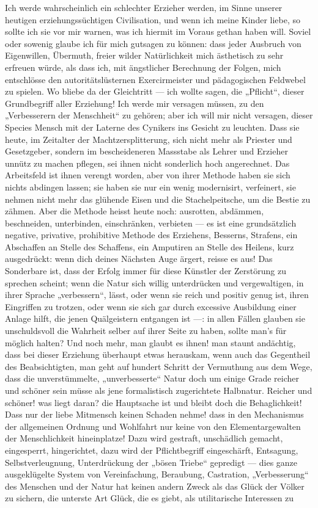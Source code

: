 Ich werde wahrscheinlich ein schlechter Erzieher werden, im Sinne unserer heutigen erziehungssüchtigen Civilisation, und wenn ich meine Kinder liebe, so sollte ich sie vor mir warnen, was ich hiermit im Voraus gethan haben will. Soviel oder sowenig glaube ich für mich gutsagen zu können: dass jeder Ausbruch von Eigenwillen, Übermuth, freier wilder Natürlichkeit mich ästhetisch zu sehr erfreuen würde, als dass ich, mit ängstlicher Berechnung der Folgen, mich entschlösse den autoritätslüsternen Exercirmeister und pädagogischen Feldwebel zu spielen. Wo bliebe da der Gleichtritt — ich wollte sagen, die „Pflicht“, dieser Grundbegriff aller Erziehung! Ich werde mir versagen müssen, zu den „Verbesserern der Menschheit“ zu gehören; aber ich will mir nicht versagen, dieser Species Mensch mit der Laterne des Cynikers ins Gesicht zu leuchten. Dass sie heute, im Zeitalter der Machtzersplitterung, sich nicht mehr als Priester und Gesetzgeber, sondern im bescheideneren Massstabe als Lehrer und Erzieher unnütz zu machen pflegen, sei ihnen nicht sonderlich hoch angerechnet. Das Arbeitsfeld ist ihnen verengt worden, aber von ihrer Methode haben sie sich nichts abdingen lassen; sie haben sie nur ein wenig modernisirt, verfeinert, sie nehmen nicht mehr das glühende Eisen und die Stachelpeitsche, um die Bestie zu zähmen. Aber die Methode heisst heute noch: ausrotten, abdämmen, beschneiden, unterbinden, einschränken, verbieten — es ist eine grundsätzlich negative, privative, prohibitive Methode des Erziehens, Besserns, Strafens, ein Abschaffen an Stelle des Schaffens, ein Amputiren an Stelle des Heilens, kurz ausgedrückt: wenn dich deines Nächsten Auge ärgert, reisse es aus! Das Sonderbare ist, dass der Erfolg immer für diese Künstler der Zerstörung zu sprechen scheint; wenn die Natur sich willig unterdrücken und vergewaltigen, in ihrer Sprache „verbessern“, lässt, oder wenn sie reich und positiv genug ist, ihren Eingriffen zu trotzen, oder wenn sie sich gar durch excessive Ausbildung einer Anlage hilft, die jenen Quälgeistern entgangen ist —: in allen Fällen glauben sie unschuldsvoll die Wahrheit selber auf ihrer Seite zu haben, sollte man’s für möglich halten? Und noch mehr, man glaubt es ihnen! man staunt andächtig, dass bei dieser Erziehung überhaupt etwas herauskam, wenn auch das Gegentheil des Beabsichtigten, man geht auf hundert Schritt der Vermuthung aus dem Wege, dass die unverstümmelte, „unverbesserte“ Natur doch um einige Grade reicher und schöner sein müsse als jene formalistisch zugerichtete Halbnatur. Reicher und schöner! was liegt daran? die Hauptsache ist und bleibt doch die Behaglichkeit! Dass nur der liebe Mitmensch keinen Schaden nehme! dass in den Mechanismus der allgemeinen Ordnung und Wohlfahrt nur keine von den Elementargewalten der Menschlichkeit hineinplatze! Dazu wird gestraft, unschädlich gemacht, eingesperrt, hingerichtet, dazu wird der Pflichtbegriff eingeschärft, Entsagung, Selbstverleugnung, Unterdrückung der „bösen Triebe“ gepredigt — dies ganze ausgeklügelte System von Vereinfachung, Beraubung, Castration, „Verbesserung“ des Menschen und der Natur hat keinen andern Zweck als das Glück der Völker zu sichern, die unterste Art Glück, die es giebt, als utilitarische Interessen zu 